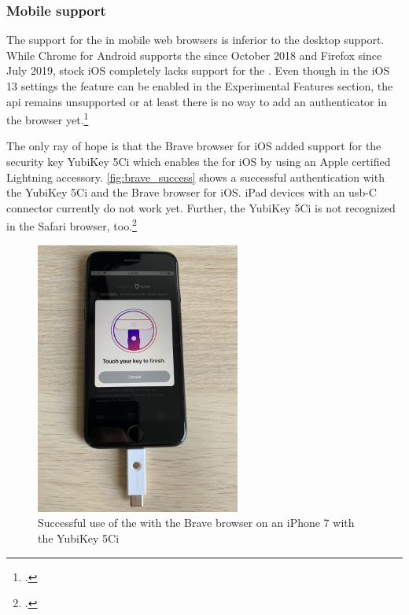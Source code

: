 \subsubsection{Mobile support}

The support for the \wa{} in mobile web browsers is inferior to the desktop support. While Chrome for Android supports the \wa{} since October 2018 and Firefox since July 2019, stock iOS completely lacks support for the \wa. Even though in the iOS 13 settings the feature can be enabled in the \frqq Experimental Features\flqq{} section, the \gls{api} remains unsupported or at least there is no way to add an authenticator in the browser yet.\footcites[See][]{chrome-android-webauthn}[See]{firefox-android-webauthn}

The only ray of hope is that the Brave browser for iOS added support for the security key \frqq YubiKey 5Ci\flqq{} which enables the \wa{} for iOS by using an Apple certified Lightning accessory. \autoref{fig:brave_success} shows a successful authentication with the YubiKey 5Ci and the Brave browser for iOS. iPad devices with an \gls{usb}-C connector currently do not work yet. Further, the YubiKey 5Ci is not recognized in the Safari browser, too.\footcites[See][]{brave-ios}[See][]{brave-now-available}[See][]{fido-ct-6}

\begin{figure}[hbt]
	\centering
	\includegraphics[width=0.6\textwidth]{pics/brave_success_5ci.eps}
	\caption[Successful use of the \wa{} with the Brave browser on an iPhone 7 with the YubiKey 5Ci]{Successful use of the \wa{} with the Brave browser on an iPhone 7 with the YubiKey 5Ci\footnotemark}
	\label{fig:brave_success}
\end{figure}

